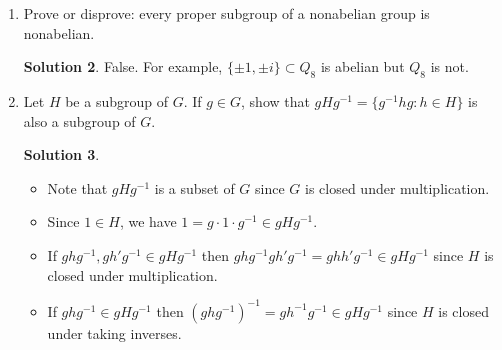 \documentclass{article}
\theoremstyle{definition}
\newtheorem*{solution}{Solution}
\begin{document}
\begin{enumerate}
\begin{solution}
\end{solution}
\item[3.52.] Prove or disprove: every proper subgroup of a nonabelian group is nonabelian.
\begin{solution}
False.  For example, $\{\pm 1, \pm i\} \subset Q_8$ is abelian but $Q_8$ is not.
\end{solution}
\item[3.54.] Let $H$ be a subgroup of $G$.  If $g \in G$, show that $gHg^{-1} = \{g^{-1}hg : h \in H\}$ is also a subgroup of $G$.
\begin{solution} $ $
\begin{itemize}
\item Note that $gHg^{-1}$ is a subset of $G$ since $G$ is closed under multiplication.
\item Since $1 \in H$, we have $1 = g\cdot 1 \cdot g^{-1} \in gHg^{-1}$.
\item If $ghg^{-1}, gh'g^{-1} \in gHg^{-1}$ then $ghg^{-1}gh'g^{-1} = ghh'g^{-1} \in gHg^{-1}$ since $H$ is closed under multiplication.
\item If $ghg^{-1} \in gHg^{-1}$ then $(ghg^{-1})^{-1} = gh^{-1}g^{-1} \in gHg^{-1}$ since $H$ is closed under taking inverses.
\end{itemize}
\end{solution}
\end{enumerate}
\end{document}

